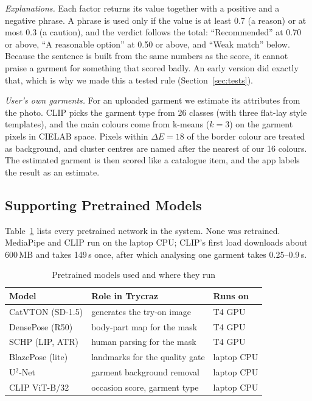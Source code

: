 \documentclass{article}
\newcommand{\unet}{U$^2$-Net}
\begin{document}
\emph{Explanations.} Each factor returns its value together with a positive and a negative phrase. A
phrase is used only if the value is at least 0.7 (a reason) or at most 0.3 (a caution), and the verdict
follows the total: ``Recommended'' at 0.70 or above, ``A reasonable option'' at 0.50 or above, and
``Weak match'' below. Because the sentence is built from the same numbers as the score, it cannot
praise a garment for something that scored badly. An early version did exactly that, which is why we
made this a tested rule (Section~\ref{sec:tests}).

\emph{User's own garments.} For an uploaded garment we estimate its attributes from the photo. CLIP
picks the garment type from 26 classes (with three flat-lay style templates), and the main colours
come from k-means ($k=3$) on the garment pixels in CIELAB space. Pixels within $\Delta E=18$ of the
border colour are treated as background, and cluster centres are named after the nearest of our 16
colours. The estimated garment is then scored like a catalogue item, and the app labels the result as
an estimate.

\subsection{Supporting Pretrained Models}

Table~\ref{tab:models} lists every pretrained network in the system. None was retrained. MediaPipe and
CLIP run on the laptop CPU; CLIP's first load downloads about 600\,MB and takes 149\,s once, after which
analysing one garment takes 0.25--0.9\,s.

\begin{table}[t]
\caption{Pretrained models used and where they run}
\label{tab:models}
\centering
\setlength{\tabcolsep}{3pt}
\begin{tabular}{@{}p{3.4cm}p{6.6cm}l@{}}
\toprule
Model & Role in Trycraz & Runs on\\
\midrule
CatVTON (SD-1.5) & generates the try-on image & T4 GPU\\
DensePose (R50) & body-part map for the mask & T4 GPU\\
SCHP (LIP, ATR) & human parsing for the mask & T4 GPU\\
BlazePose (lite) & landmarks for the quality gate & laptop CPU\\
\unet{} & garment background removal & laptop CPU\\
CLIP ViT-B/32 & occasion score, garment type & laptop CPU\\
\bottomrule
\end{tabular}
\end{table}
\end{document}
